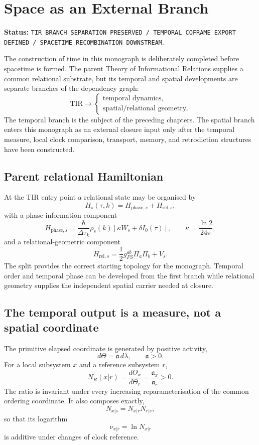 \chapter{Space as an External Branch}

\noindent\textbf{Status:} \texttt{TIR BRANCH SEPARATION PRESERVED / TEMPORAL COFRAME EXPORT DEFINED / SPACETIME RECOMBINATION DOWNSTREAM}.

The construction of time in this monograph is deliberately completed before spacetime is formed. The parent Theory of Informational Relations supplies a common relational substrate, but its temporal and spatial developments are separate branches of the dependency graph:
\[
\boxed{
\mathrm{TIR}
\longrightarrow
\begin{cases}
\text{temporal dynamics},\\
\text{spatial/relational geometry}.
\end{cases}}
\]
The temporal branch is the subject of the preceding chapters. The spatial branch enters this monograph as an external closure input only after the temporal measure, local clock comparison, transport, memory, and retrodiction structures have been constructed.

\section{Parent relational Hamiltonian}

At the TIR entry point a relational state may be organised by
\[
H_s(\tau,k)=H_{\mathrm{phase},s}+H_{\mathrm{rel},s},
\]
with a phase-information component
\[
H_{\mathrm{phase},s}
=
\frac{\hbar}{\Delta\tau_k}\rho_s(k)
\left[\kappa W_s+\delta I_0(\tau)\right],
\qquad
\kappa=\frac{\ln2}{24\pi},
\]
and a relational-geometric component
\[
H_{\mathrm{rel},s}
=
\frac12 g_{FS}^{ab}\Pi_a\Pi_b+V_s.
\]
The split provides the correct starting topology for the monograph. Temporal order and temporal phase can be developed from the first branch while relational geometry supplies the independent spatial carrier needed at closure.

\section{The temporal output is a measure, not a spatial coordinate}

The primitive elapsed coordinate is generated by positive activity,
\[
d\Theta=\mathfrak a\,d\lambda,
\qquad \mathfrak a>0.
\]
For a local subsystem \(x\) and a reference subsystem \(r\),
\[
N_R(x|r)
=
\frac{d\Theta_x}{d\Theta_r}
=
\frac{\mathfrak a_x}{\mathfrak a_r}>0.
\]
The ratio is invariant under every increasing reparameterisation of the common ordering coordinate. It also composes exactly,
\[
N_{x|s}=N_{x|r}N_{r|s},
\]
so that its logarithm
\[
\nu_{x|r}=\ln N_{x|r}
\]
is additive under changes of clock reference.

